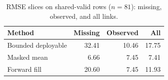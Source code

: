\begin{table}[t]
\centering
\caption{RMSE slices on shared-valid rows ($n{=}81$): missing, observed, and all links.}
\label{tab:rmse-slices}
\begin{tabular}{lrrr}
\toprule
Method & Missing & Observed & All \\
\midrule
Bounded deployable & 32.41 & 10.46 & 17.75 \\
Masked mean & 6.66 & 7.45 & 7.41 \\
Forward fill & 20.60 & 7.45 & 11.93 \\
\bottomrule
\end{tabular}
\end{table}

